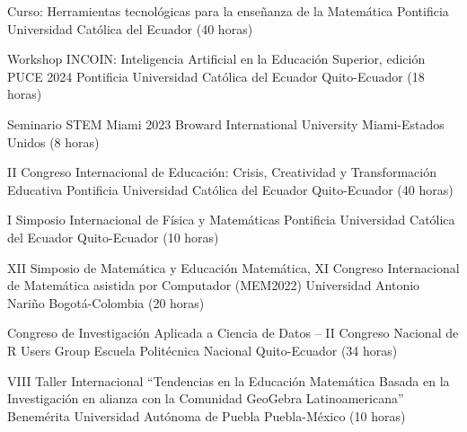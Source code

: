 \documentclass[
	a4paper,
	maincolor=cvblue!70!blue,
	sidecolor=gray!30,
	sectioncolor=cvblue!70!blue,
    sidebarwidth=7.5cm,
	topbottommargin=20pt,
	leftrightmargin=20pt,
]{fortysecondscv}
\begin{document}
    {Curso: Herramientas tecnológicas para la enseñanza de la Matemática}
    {}
    {Pontificia Universidad Católica del Ecuador (40 horas)}
    

    
    

    
    {Workshop INCOIN: Inteligencia Artificial en la Educación Superior, edición PUCE 2024}
    {Pontificia Universidad Católica del Ecuador}
    {Quito-Ecuador (18 horas)}
    
    {Seminario STEM Miami 2023}
    {Broward International University}
    {Miami-Estados Unidos (8 horas)}

    {II Congreso Internacional de Educación: Crisis, Creatividad y Transformación Educativa}
    {Pontificia Universidad Católica del Ecuador}
    {Quito-Ecuador (40 horas)}

    {I Simposio Internacional de Física y Matemáticas}
    {Pontificia Universidad Católica del Ecuador}
    {Quito-Ecuador (10 horas)}

    {XII Simposio de Matemática y Educación Matemática, XI Congreso Internacional de Matemática asistida por Computador (MEM2022)}
    {Universidad Antonio Nariño}
    {Bogotá-Colombia (20 horas)}

    {Congreso de Investigación Aplicada a Ciencia de Datos – II Congreso Nacional de R Users Group}
    {Escuela Politécnica Nacional}
    {Quito-Ecuador (34 horas)}

    {VIII Taller Internacional “Tendencias en la Educación Matemática Basada en la Investigación en alianza con la Comunidad GeoGebra Latinoamericana”}
    {Benemérita Universidad Autónoma de Puebla}
    {Puebla-México (10 horas)}

\end{document}
